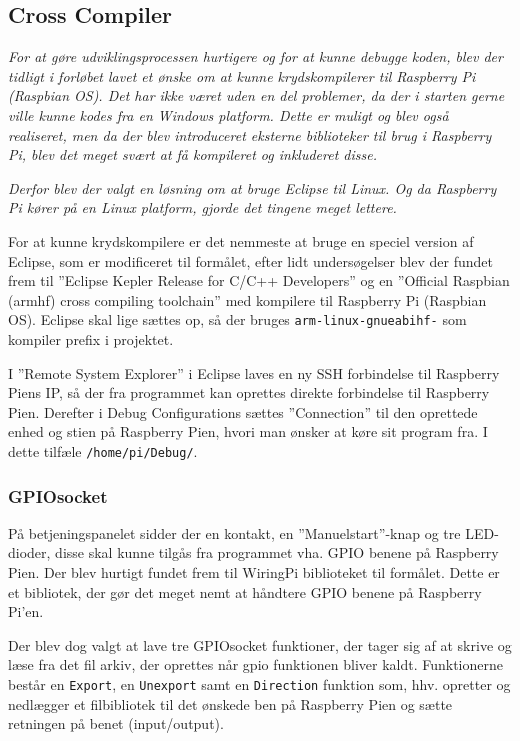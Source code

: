 \subsection*{Cross Compiler}

\textit{For at gøre udviklingsprocessen hurtigere og for at kunne debugge koden, blev der tidligt i forløbet lavet et ønske om at kunne krydskompilerer til Raspberry Pi (Raspbian OS). Det har ikke været uden en del problemer, da der i starten gerne ville kunne kodes fra en Windows platform. Dette er muligt og blev også realiseret, men da der blev introduceret eksterne biblioteker til brug i Raspberry Pi, blev det meget svært at få kompileret og inkluderet disse.}

\textit{Derfor blev der valgt en løsning om at bruge Eclipse til Linux. Og da Raspberry Pi kører på en Linux platform, gjorde det tingene meget lettere.}

For at kunne krydskompilere er det nemmeste at bruge en speciel version af Eclipse, som er modificeret til formålet, efter lidt undersøgelser blev der fundet frem til ''Eclipse Kepler Release for C/C++ Developers'' \citep{website:eclipsekepler} og en ''Official Raspbian (armhf) cross compiling toolchain'' \citep{website:rpitoolchain} med kompilere til Raspberry Pi (Raspbian OS). Eclipse skal lige sættes op, så der bruges \verb+arm-linux-gnueabihf-+ som kompiler prefix i projektet.

I ''Remote System Explorer'' i Eclipse laves en ny SSH forbindelse til Raspberry Piens IP, så der fra programmet kan oprettes direkte forbindelse til Raspberry Pien. Derefter i Debug Configurations sættes ''Connection'' til den oprettede enhed og stien på Raspberry Pien, hvori man ønsker at køre sit program fra. I dette tilfæle \verb+/home/pi/Debug/+.

\subsubsection*{GPIOsocket}

På betjeningspanelet sidder der en kontakt, en ''Manuelstart''-knap og tre LED-dioder, disse skal kunne tilgås fra programmet vha. GPIO benene på Raspberry Pien. Der blev hurtigt fundet frem til WiringPi biblioteket \citep{website:wiringpi} til formålet. Dette er et bibliotek, der gør det meget nemt at håndtere GPIO benene på Raspberry Pi'en.

Der blev dog valgt at lave tre GPIOsocket funktioner, der tager sig af at skrive og læse fra det fil arkiv, der oprettes når gpio funktionen bliver kaldt. Funktionerne består en \verb+Export+, en \verb+Unexport+ samt en \verb+Direction+ funktion som, hhv. opretter og nedlægger et filbibliotek til det ønskede ben på Raspberry Pien og sætte retningen på benet (input/output).

